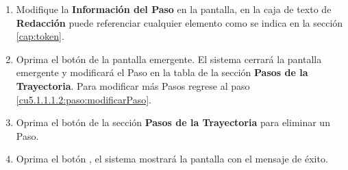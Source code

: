 \begin{enumerate}
	
	\item Modifique la \textbf{Información del Paso} en la pantalla, en la caja de texto de \textbf{Redacción} puede referenciar cualquier elemento como se indica en la sección \ref{cap:token}.
	
	\item Oprima el botón  de la pantalla emergente. El sistema cerrará la pantalla emergente y modificará el Paso en la tabla de la sección \textbf{Pasos de la Trayectoria}. Para modificar más Pasos regrese al paso \ref{cu5.1.1.1.2:paso:modificarPaso}.
	
	\item Oprima el botón \btnEliminar de la sección \textbf{Pasos de la Trayectoria} para eliminar un Paso.
	
	\item Oprima el botón , el sistema mostrará la pantalla  con el mensaje de éxito.
\end{enumerate}
